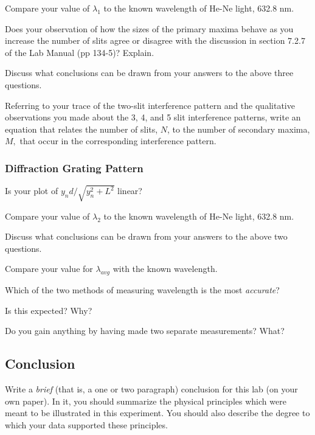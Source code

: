 \noindent
Compare your value of $\lambda _1$ to the known wavelength of He-Ne light, 632.8 nm.
\newpage

\noindent
Does your observation of how the sizes of the primary maxima behave as you increase
the number of slits agree or disagree with the discussion in section 7.2.7 of the Lab
Manual (pp 134-5)? Explain.
\vspace*{2cm}
  
\noindent
Discuss what conclusions can be drawn from your answers to the above three questions.
\vspace*{3cm}

\noindent
Referring to your trace of the two-slit interference pattern and the qualitative
observations you made about the 3, 4, and 5 slit interference patterns, write an
equation that relates the number of slits, $N$, to the number of secondary maxima, 
$M,$ that occur in the corresponding interference pattern.
\newpage

\subsubsection{Diffraction Grating Pattern}
Is your plot of $y_nd/ \sqrt{y_n^2 + L^2}$ linear?
\vspace*{.3cm}

\noindent
Compare your value of $\lambda _2$ to the known wavelength of He-Ne light, 632.8 nm.
\vspace*{1.4 cm}

\noindent
Discuss what conclusions can be drawn from your answers to the above two questions.
\vspace*{3cm}

\noindent
Compare your value for $\lambda _{avg}$ with the known wavelength.
\vspace*{1.4cm}

\noindent
Which of the two methods of measuring wavelength is the most {\it accurate}?
\vspace*{.5cm}

\noindent
Is this expected? Why?
\vspace*{1cm}

\noindent
Do you gain anything by having made two separate measurements? What?
\vspace*{1.4cm} 


\subsection{Conclusion}

Write a {\it brief} (that is, a one or two paragraph) conclusion for this lab (on your
own paper). In it, you should summarize the physical principles which were meant to be
illustrated in this experiment. You should also describe the degree to which your data
supported these principles.




